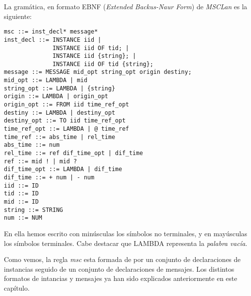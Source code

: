 La gramática, en formato EBNF (\emph{Extended Backus-Naur Form}) de
\textit{MSCLan} es la siguiente:
\begin{lstlisting}[style=spec, language={}]
msc ::= inst_decl* message*
inst_decl ::= INSTANCE iid |
              INSTANCE iid OF tid; |
              INSTANCE iid {string}; |
              INSTANCE iid OF tid {string};               
message ::= MESSAGE mid_opt string_opt origin destiny;
mid_opt ::= LAMBDA | mid
string_opt ::= LAMBDA | {string}
origin ::= LAMBDA | origin_opt
origin_opt ::= FROM iid time_ref_opt
destiny ::= LAMBDA | destiny_opt
destiny_opt ::= TO iid time_ref_opt
time_ref_opt ::= LAMBDA | @ time_ref
time_ref ::= abs_time | rel_time
abs_time ::= num
rel_time ::= ref dif_time_opt | dif_time
ref ::= mid ! | mid ?
dif_time_opt ::= LAMBDA | dif_time
dif_time ::= + num | - num
iid ::= ID
tid ::= ID
mid ::= ID
string ::= STRING
num ::= NUM
\end{lstlisting}

En ella hemos escrito con minúsculas los símbolos no terminales, y en 
mayúsculas los símbolos terminales. Cabe destacar que LAMBDA
representa la \textit{palabra vacía}.

Como vemos, la regla \textit{msc} esta formada de por un conjunto de
declaraciones de instancias seguido de un conjunto de declaraciones de
mensajes. Los distintos formatos de intancias y mensajes ya han sido
explicados anteriormente en este capítulo.

